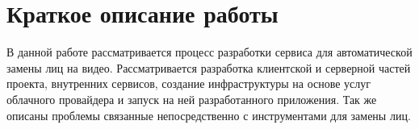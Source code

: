 \section*{Краткое описание работы}

В данной работе рассматривается процесс разработки сервиса для автоматической замены лиц на видео. Рассматривается разработка клиентской и серверной частей проекта, внутренних сервисов, создание инфраструктуры на основе услуг облачного провайдера и запуск на ней разработанного приложения. Так же описаны проблемы связанные непосредственно с инструментами для замены лиц.